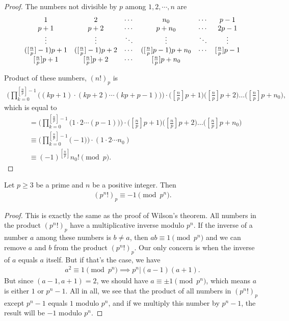 \documentclass{subfile}
\begin{document}
	\begin{proof}
		The numbers not divisible by $p$ among $1, 2, \cdots, n$ are
			\[\begin{array}{*{20}{c}}
				1&2& \cdots &{{n_0}}& \cdots &{p - 1}\\
				{p + 1}&{p + 2}& \cdots &{p + {n_0}}& \cdots &{2p - 1}\\
				\vdots & \vdots & \ddots & \vdots & \ddots & \vdots \\
				{( {[{\textstyle{n \over p}}] - 1} )p + 1}&{( {[{\textstyle{n \over p}}] - 1} )p + 2}& \cdots &{( {[{\textstyle{n \over p}}]p - 1} )p + {n_0}}& \cdots &{[{\textstyle{n \over p}}]p - 1}\\
				{[{\textstyle{n \over p}}]p + 1}&{[{\textstyle{n \over p}}]p + 2}& \cdots &{[{\textstyle{n \over p}}]p + {n_0}}&{}&{}
			\end{array}\]

	Product of these numbers, $(n!)_p$ is
		\begin{align*}
			\Bigg(\prod_{k=0}^{[\frac np]-1}\!\!\bigl((kp+1)\cdot(kp+2)\cdots(kp+p-1)\bigr)\Bigg)  \cdot  
			\bigl([\tfrac np]p+1\bigl)\bigl([\tfrac np]p+2\bigl)\dots\bigl([\tfrac np]p+n_0\bigl),
		\end{align*}
	which is equal to
		\begin{align*}
			&=\Bigg(\prod_{k=0}^{[\frac np]-1}\!\!\bigl(1\cdot2\cdots(p-1)\bigr)\Bigg)  \cdot  
			\bigl([\tfrac np]p+1\bigl)\bigl([\tfrac np]p+2\bigl)\dots\bigl([\tfrac np]p+n_0\bigl)\\
			&\equiv \Bigg(\prod_{k=0}^{[\frac np]-1}\!\!\bigl(-1\bigr) \Bigg) \cdot \left(
			1 \cdot 2 \cdots n_0\right)\\
			&\equiv
			(-1)^{[\frac np]} n_0!\pmod p.
		\end{align*}
	\end{proof}

			
	\begin{proposition}
		Let $p\geq 3$ be a prime and $n$ be a positive integer. Then
			\begin{align*}
				(p^n!)_p \equiv -1 \pmod{p^n}.
			\end{align*}
	\end{proposition}
	
	\begin{proof}
		This is exactly the same as the proof of Wilson's theorem. All numbers in the product $(p^n!)_p$ have a multiplicative inverse modulo $p^n$. If the inverse of a number $a$ among these numbers is $b \neq a$, then $a b \equiv 1 \pmod{p^n}$ and we can remove $a$ and $b$ from the product $(p^n!)_p$. Our only concern is when the inverse of $a$ equals $a$ itself. But if that's the case, we have
			\begin{align*}
				a^2 \equiv 1 \pmod{p^n} \implies p^n| (a-1)(a+1).
			\end{align*}
		But since $(a-1,a+1)=2$, we should have $a \equiv \pm 1 \pmod{p^n}$, which means $a$ is either $1$ or $p^n-1$. All in all, we see that the product of all numbers in $(p^n!)_p$ except $p^n-1$ equals $1$ modulo $p^n$, and if we multiply this number by $p^n-1$, the result will be $-1$ modulo $p^n$.
	\end{proof}
	
\end{document}
